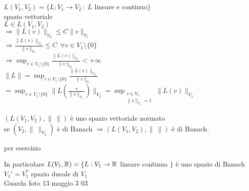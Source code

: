 \documentclass[12px]{article}
\begin{document}
   $L(V_1,V_2) = \{L:V_1 \rightarrow V_2\ : \ L$ lineare e continuo$\}$\\
   spazio vettoriale\\
   $L\in L(V_1,V_2)$\\
   $ \Rightarrow  \|L(v)\|_{V_2}\leq C\|v\|_{V_1}$ \\
   $ \Rightarrow  \frac {\|L(v)\|_{V_2}}{\|v\|_{V_1}}\leq C \ \ \forall v\in V_1\setminus\{0\}$\\
   $ \Rightarrow  \sup_{v\in V_1\setminus\{0\}}\frac {\|L(v)\|_{V_2}}{\|v\|_{V_1}} < +\infty$ \\
   $\|L\| = \sup_{v\in V_1\setminus\{0\}}\frac {\|L(v)\|_{V_2}}{\|v\|_{V_1}}$\\
   $=\sup_{v\in V_1\setminus\{0\}}\|L(\frac v {\|v\|_{V_1}})\|_{V_2} = \sup_{\substack{v\in V_1\\ \|v\|_{V_1} = 1}}\|L(v)\|_{V_2}$
   \begin{teo}
   $(L(V_1,V_2), \|\ \|)$ è uno spazio vettoriale normato \\
   se $(V_2, \|\ \|_{V_2})$ è di Banach $ \Rightarrow  (L(V_1,V_2), \|\ \|)$ è di Banach.
   \end{teo}
   \begin{dimo}
   	per esercizio
   \end{dimo}
   In particolare $L(V_1, \mathbb{R}) = \{L : V_1 \rightarrow \mathbb{R}$ lineare continua $\}$ è uno spazio di Banach\\
   $V_1' = V_1^*$ spazio dueale di $V_1$\\
   Guarda foto 13 maggio 3 03
\end{document}
